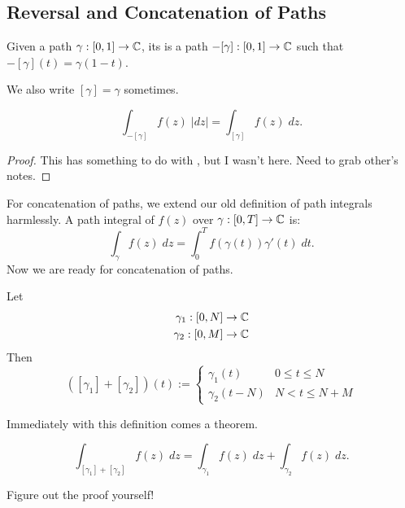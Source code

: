 \documentclass[notes]{subfile}
\begin{document}
\subsection{Reversal and Concatenation of Paths}

\begin{definition}
    Given a path $\gamma : [0,1] \to \operatorname{\mathbb{C}}$, its 
    is a path $-[\gamma] : [0,1] \to \operatorname{\mathbb{C}}$ such that 
    $-[\gamma](t) = \gamma(1-t)$.
\end{definition}
We also write $[\gamma] = \gamma$ sometimes.

\begin{theorem}
    \[ \int_{-[\gamma]} f(z) \; |dz| = \int_{[\gamma]} f(z) \; dz. \]
\end{theorem}

\begin{proof}
    This has something to do with , but I wasn't
    here. 
    Need to grab other's notes.
\end{proof}

For concatenation of paths, we extend our old definition of
path integrals harmlessly.
A path integral of $f(z)$ over $\gamma : [0,T] \to \operatorname{\mathbb{C}}$ is:
\[ \int_{\gamma} f(z) \; dz = \int_0^T f(\gamma(t)) \gamma'(t) \; dt. \]
Now we are ready for concatenation of paths.

\begin{definition}
    Let 
    \begin{align*}
        \gamma_1 : [0,N] \to \operatorname{\mathbb{C}} \\
        \gamma_2 : [0,M] \to \operatorname{\mathbb{C}}
    \end{align*}
    Then 
    \[ ([\gamma_1] + [\gamma_2])(t) := 
        \begin{cases}
            \gamma_1(t) & 0 \le t \le N \\
            \gamma_2(t-N) & N < t \le N+M
        \end{cases}
    \]
\end{definition}

Immediately with this definition comes a theorem.
\begin{theorem}
    \[ \int_{[\gamma_1] + [\gamma_2]} f(z) \; dz =
    \int_{\gamma_1} f(z) \; dz + \int_{\gamma_2} f(z) \; dz. \]
\end{theorem}

Figure out the proof yourself!
\end{document}
